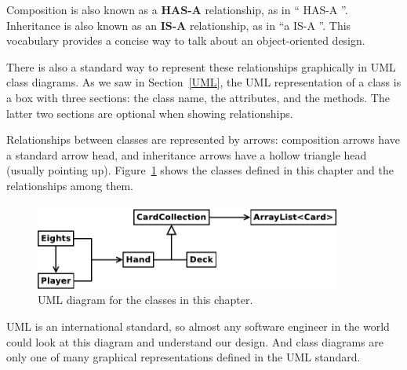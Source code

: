 Composition is also known as a {\bf HAS-A} relationship, as in `` HAS-A ''.
Inheritance is also known as an {\bf IS-A} relationship, as in ``a  IS-A ''.
This vocabulary provides a concise way to talk about an object-oriented design.



There is also a standard way to represent these relationships graphically in UML class diagrams.
As we saw in Section~\ref{UML}, the UML representation of a class is a box with three sections: the class name, the attributes, and the methods.
The latter two sections are optional when showing relationships.


Relationships between classes are represented by arrows: composition arrows have a standard arrow head, and inheritance arrows have a hollow triangle head (usually pointing up).
Figure~\ref{fig.uml1} shows the classes defined in this chapter and the relationships among them.


\begin{figure}[!ht]
\begin{center}
\includegraphics[width=0.9\textwidth]{figs/uml1.pdf}
\caption{UML diagram for the classes in this chapter.}
\label{fig.uml1}
\end{center}
\end{figure}

UML is an international standard, so almost any software engineer in the world could look at this diagram and understand our design.
And class diagrams are only one of many graphical representations defined in the UML standard.

